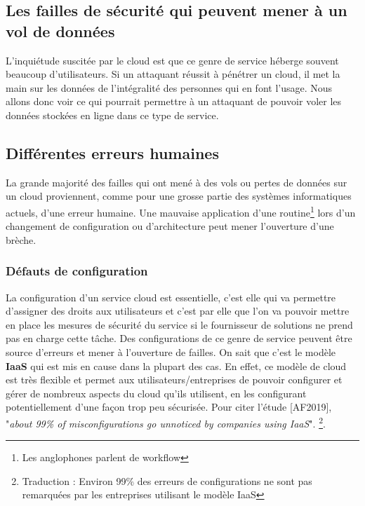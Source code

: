 \documentclass[a4paper, 12pt]{article}
\begin{document}
\begin{spacing}{1.1}
  \section{Les failles de sécurité qui peuvent mener à un vol de données}
    L'inquiétude suscitée par le cloud est que ce genre de service héberge
    souvent beaucoup d'utilisateurs. Si un attaquant réussit à pénétrer un
    cloud, il met la main sur les données de l'intégralité des personnes qui en
    font l'usage. Nous allons donc voir ce qui pourrait permettre à un attaquant
    de pouvoir voler les données stockées en ligne dans ce type de service.

    \subsection{Différentes erreurs humaines}
      La grande majorité des failles qui ont mené à des vols ou pertes de
      données sur un cloud proviennent, comme pour une grosse partie des
      systèmes informatiques actuels, d'une erreur humaine. Une mauvaise
      application d'une routine\footnote{Les anglophones parlent de workflow}
      lors d'un changement de configuration ou d'architecture peut mener
      l'ouverture d'une brèche.

      \subsubsection{Défauts de configuration}
        La configuration d'un service cloud est essentielle, c'est elle qui va
        permettre d'assigner des droits aux utilisateurs et c'est par elle que
        l'on va pouvoir mettre en place les mesures de sécurité du service si le
        fournisseur de solutions ne prend pas en charge cette tâche. Des
        configurations de ce genre de service peuvent être source d'erreurs et
        mener à l'ouverture de failles. On sait que c'est le modèle
        \textbf{IaaS} qui est mis en cause dans la plupart des cas. En effet, ce
        modèle de cloud est très flexible et permet aux utilisateurs/entreprises
        de pouvoir configurer et gérer de nombreux aspects du cloud qu'ils
        utilisent, en les configurant potentiellement d'une façon trop peu
        sécurisée. Pour citer l'étude [AF2019], "\textit{about 99\% of
        misconfigurations go unnoticed by companies using IaaS}".
        \footnote{Traduction : Environ 99\% des erreurs de configurations ne
        sont pas remarquées par les entreprises utilisant le modèle IaaS}.


\end{spacing}
\end{document}
